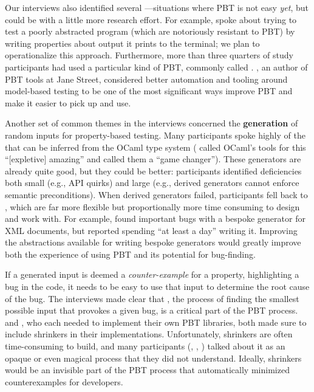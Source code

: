 Our interviews also identified several ---situations where PBT is not easy {\em yet}, but could be with a
little more research effort. For example,  spoke about trying to
test a poorly abstracted program (which are notoriously resistant to PBT) by
writing properties about output it prints to the terminal; we plan to
operationalize this approach.
Furthermore, more than three quarters of study participants had used a
particular kind of PBT, commonly called
.
, an author of PBT tools at Jane Street, considered better
automation and tooling around model-based testing to be one of the most
significant ways improve PBT and make it easier to pick up and use.

Another set of common themes in the interviews concerned the {\bf generation} of
random inputs for property-based testing. Many participants spoke
highly of the  that can be inferred from
the OCaml type system ( called OCaml's tools for this
``[expletive] amazing'' and  called them a ``game changer'').
These generators are already quite good, but they could be better: participants
identified deficiencies both small (e.g., API quirks) and large (e.g.,
derived generators
cannot enforce semantic preconditions). When derived generators
failed, participants fell back to , which
are far more flexible but proportionally more time consuming to design and work
with. For example,  found important bugs with a bespoke
generator for XML documents,
but reported spending ``at least a day'' writing it.
Improving the abstractions available for writing bespoke generators would
greatly improve both the experience of using PBT and its potential for
bug-finding.

If a generated input is deemed a {\em counter-example} for a property,
highlighting a bug in the code, it needs to be easy to use that input to
determine the root cause of the bug. The interviews made clear that
, the process of finding the smallest possible input that
provokes a given bug, is a critical part of the PBT process.  
and , who each needed to implement their own PBT libraries, both
made sure to include shrinkers in their implementations. Unfortunately,
shrinkers are often time-consuming to build, and many participants
(,  , ) talked
about it as an opaque or even magical process that they did not understand.
Ideally, shrinkers would be an invisible part of the PBT process that
automatically minimized counterexamples for developers.

